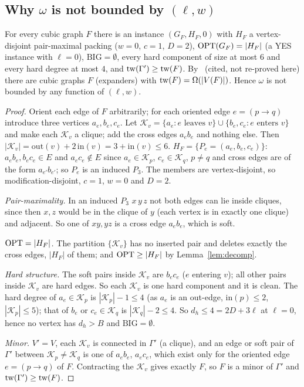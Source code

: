 \subsection{Why \texorpdfstring{$\omega$}{omega} is not bounded by \texorpdfstring{$(\ell,w)$}{(l,w)}}
\begin{proposition}[$\omega$ is unbounded at $\ell=0$, $w=0$]\label{prop:expander}
For every cubic graph $F$ there is an instance $(G_F,H_F,0)$ with $H_F$ a vertex-disjoint pair-maximal packing ($w=0$, $c=1$, $D=2$), $\mathrm{OPT}(G_F)=|H_F|$ (a YES instance with $\ell=0$), $\mathrm{BIG}=\emptyset$, every hard component of size at most $6$ and every hard degree at most $4$, and $\mathrm{tw}(\Gamma')\ge\mathrm{tw}(F)$. By~\cite{GM09} (cited, not re-proved here) there are cubic graphs $F$ (expanders) with $\mathrm{tw}(F)=\Omega(|V(F)|)$. Hence $\omega$ is not bounded by any function of $(\ell,w)$.
\end{proposition}
\begin{proof}
Orient each edge of $F$ arbitrarily; for each oriented edge $e=(p\to q)$ introduce three vertices $a_e,b_e,c_e$. Let $\mathcal K_v=\{a_e:e\text{ leaves }v\}\cup\{b_e,c_e:e\text{ enters }v\}$ and make each $\mathcal K_v$ a clique; add the cross edges $a_eb_e$ and nothing else. Then $|\mathcal K_v|=\mathrm{out}(v)+2\,\mathrm{in}(v)=3+\mathrm{in}(v)\le6$. $H_F=\{P_e=(a_e,b_e,c_e)\}$: $a_eb_e,b_ec_e\in E$ and $a_ec_e\notin E$ since $a_e\in\mathcal K_p$, $c_e\in\mathcal K_q$, $p\ne q$ and cross edges are of the form $a_{e'}b_{e'}$; so $P_e$ is an induced $P_3$. The members are vertex-disjoint, so modification-disjoint, $c=1$, $w=0$ and $D=2$.

\emph{Pair-maximality.} In an induced $P_3$ $x\,y\,z$ not both edges can lie inside cliques, since then $x,z$ would be in the clique of $y$ (each vertex is in exactly one clique) and adjacent. So one of $xy,yz$ is a cross edge $a_eb_e$, which is soft.

\emph{$\mathrm{OPT}=|H_F|$.} The partition $\{\mathcal K_v\}$ has no inserted pair and deletes exactly the cross edges, $|H_F|$ of them; and $\mathrm{OPT}\ge|H_F|$ by Lemma~\ref{lem:decomp}.

\emph{Hard structure.} The soft pairs inside $\mathcal K_v$ are $b_ec_e$ ($e$ entering $v$); all other pairs inside $\mathcal K_v$ are hard edges. So each $\mathcal K_v$ is one hard component and it is clean. The hard degree of $a_e\in\mathcal K_p$ is $|\mathcal K_p|-1\le4$ (as $a_e$ is an out-edge, $\mathrm{in}(p)\le2$, $|\mathcal K_p|\le5$); that of $b_e$ or $c_e\in\mathcal K_q$ is $|\mathcal K_q|-2\le4$. So $d_h\le4=2D+3\ell$ at $\ell=0$, hence no vertex has $d_h>B$ and $\mathrm{BIG}=\emptyset$.

\emph{Minor.} $V'=V$, each $\mathcal K_v$ is connected in $\Gamma'$ (a clique), and an edge or soft pair of $\Gamma'$ between $\mathcal K_p\ne\mathcal K_q$ is one of $a_eb_e$, $a_ec_e$, which exist only for the oriented edge $e=(p\to q)$ of $F$. Contracting the $\mathcal K_v$ gives exactly $F$, so $F$ is a minor of $\Gamma'$ and $\mathrm{tw}(\Gamma')\ge\mathrm{tw}(F)$.
\end{proof}
